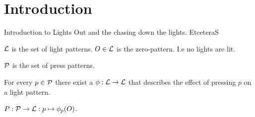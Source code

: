 \section{Introduction}

Introduction to Lights Out and the chasing down the lights. EtceteraS

\begin{definition}
  $\mathcal{L}$ is the set of light patterns. $O \in \mathcal{L}$ is the
  zero-pattern. I.e no lights are lit.

  $\mathcal{P}$ is the set of press patterns.

  For every $p\in\mathcal{P}$ there exist a $\phi : \mathcal{L} \rightarrow \mathcal{L}$ that
  describes the effect of pressing $p$ on a light pattern.

  $P : \mathcal{P} \rightarrow \mathcal{L} : p \mapsto \phi_{p}(O)$.
\end{definition}
